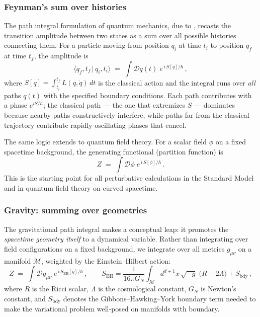\documentclass[11pt,letterpaper]{article}
\theoremstyle{plain}
\theoremstyle{definition}
\theoremstyle{remark}
\begin{document}
\subsubsection*{Feynman's sum over histories}

The path integral formulation of quantum mechanics, due to
\citet{feynman1948}, recasts the transition amplitude between two states as a sum
over all possible histories connecting them.  For a particle moving from position
$q_i$ at time $t_i$ to position $q_f$ at time $t_f$, the amplitude is
\begin{equation}\label{eq05:particle_path_integral}
  \langle q_f, t_f \,|\, q_i, t_i \rangle
  \;=\; \int \mathcal{D}q(t)\; e^{\,i\,S[q]/\hbar}\,,
\end{equation}
where $S[q] = \int_{t_i}^{t_f} L(q,\dot{q})\,dt$ is the classical action and
the integral runs over \emph{all} paths $q(t)$ with the specified boundary
conditions.  Each path contributes with a phase $e^{iS/\hbar}$; the classical
path --- the one that extremizes $S$ --- dominates because nearby paths
constructively interfere, while paths far from the classical trajectory
contribute rapidly oscillating phases that cancel.

The same logic extends to quantum field theory.  For a scalar field $\phi$ on a
fixed spacetime background, the generating functional (partition function) is
\begin{equation}\label{eq05:qft_path_integral}
  Z \;=\; \int \mathcal{D}\phi\; e^{\,i\,S[\phi]/\hbar}\,.
\end{equation}
This is the starting point for all perturbative calculations in the Standard
Model and in quantum field theory on curved spacetime.

\subsubsection*{Gravity: summing over geometries}

The gravitational path integral makes a conceptual leap: it promotes the
\emph{spacetime geometry itself} to a dynamical variable.  Rather than
integrating over field configurations on a fixed background, we integrate over
all metrics $g_{\mu\nu}$ on a manifold $\mathcal{M}$, weighted by the
Einstein--Hilbert action:
\begin{equation}\label{eq05:grav_path_integral_lorentzian}
  Z \;=\; \int \mathcal{D}g_{\mu\nu}\; e^{\,i\,S_{\mathrm{EH}}[g]/\hbar}\,,
  \qquad
  S_{\mathrm{EH}} = \frac{1}{16\pi G_N}\int_{\mathcal{M}} d^{d+1}x\,\sqrt{-g}\;
  \bigl(R - 2\Lambda\bigr) + S_{\mathrm{bdy}}\,,
\end{equation}
where $R$ is the Ricci scalar, $\Lambda$ is the cosmological constant,
$G_N$ is Newton's constant, and $S_{\mathrm{bdy}}$ denotes the
Gibbons--Hawking--York boundary term \citep{gibbonshawking1977, york1972} needed
to make the variational problem well-posed on manifolds with boundary.
\end{document}

